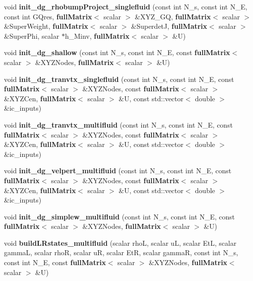 \begin{DoxyCompactItemize}
\item 
void {\bfseries init\-\_\-dg\-\_\-rhobump\-Project\-\_\-singlefluid} (const int N\-\_\-s, const int N\-\_\-\-E, const int G\-Qres, {\bf full\-Matrix}$<$ scalar $>$ \&X\-Y\-Z\-\_\-\-G\-Q, {\bf full\-Matrix}$<$ scalar $>$ \&Super\-Weight, {\bf full\-Matrix}$<$ scalar $>$ \&Superdet\-J, {\bf full\-Matrix}$<$ scalar $>$ \&Super\-Phi, scalar $\ast$h\-\_\-\-Minv, {\bf full\-Matrix}$<$ scalar $>$ \&U)\label{init__cond_8cc_a832b4cdedee81b5eb9193874a9182883}

\item 
void {\bfseries init\-\_\-dg\-\_\-shallow} (const int N\-\_\-s, const int N\-\_\-\-E, const {\bf full\-Matrix}$<$ scalar $>$ \&X\-Y\-Z\-Nodes, {\bf full\-Matrix}$<$ scalar $>$ \&U)\label{init__cond_8cc_ab925bf9fb2c60220628e218e1c530d70}

\item 
void {\bfseries init\-\_\-dg\-\_\-tranvtx\-\_\-singlefluid} (const int N\-\_\-s, const int N\-\_\-\-E, const {\bf full\-Matrix}$<$ scalar $>$ \&X\-Y\-Z\-Nodes, const {\bf full\-Matrix}$<$ scalar $>$ \&X\-Y\-Z\-Cen, {\bf full\-Matrix}$<$ scalar $>$ \&U, const std\-::vector$<$ double $>$ \&ic\-\_\-inputs)\label{init__cond_8cc_ad3c7b4a445de0cb89c26615bffa3d76a}

\item 
void {\bfseries init\-\_\-dg\-\_\-tranvtx\-\_\-multifluid} (const int N\-\_\-s, const int N\-\_\-\-E, const {\bf full\-Matrix}$<$ scalar $>$ \&X\-Y\-Z\-Nodes, const {\bf full\-Matrix}$<$ scalar $>$ \&X\-Y\-Z\-Cen, {\bf full\-Matrix}$<$ scalar $>$ \&U, const std\-::vector$<$ double $>$ \&ic\-\_\-inputs)\label{init__cond_8cc_adca88d4a88266161095097054c36d7b4}

\item 
void {\bfseries init\-\_\-dg\-\_\-velpert\-\_\-multifluid} (const int N\-\_\-s, const int N\-\_\-\-E, const {\bf full\-Matrix}$<$ scalar $>$ \&X\-Y\-Z\-Nodes, const {\bf full\-Matrix}$<$ scalar $>$ \&X\-Y\-Z\-Cen, {\bf full\-Matrix}$<$ scalar $>$ \&U, const std\-::vector$<$ double $>$ \&ic\-\_\-inputs)\label{init__cond_8cc_a10d8612d0bfbe8587556c05b7df649ff}

\item 
void {\bfseries init\-\_\-dg\-\_\-simplew\-\_\-multifluid} (const int N\-\_\-s, const int N\-\_\-\-E, const {\bf full\-Matrix}$<$ scalar $>$ \&X\-Y\-Z\-Nodes, {\bf full\-Matrix}$<$ scalar $>$ \&U)\label{init__cond_8cc_a09c88c3865d7af5c24b4fde30a2675ee}

\item 
void {\bfseries build\-L\-Rstates\-\_\-multifluid} (scalar rho\-L, scalar u\-L, scalar Et\-L, scalar gamma\-L, scalar rho\-R, scalar u\-R, scalar Et\-R, scalar gamma\-R, const int N\-\_\-s, const int N\-\_\-\-E, const {\bf full\-Matrix}$<$ scalar $>$ \&X\-Y\-Z\-Nodes, {\bf full\-Matrix}$<$ scalar $>$ \&U)\label{init__cond_8cc_abf0d45c3303a86810fb3bb83e5c55d80}


\end{DoxyCompactItemize}
